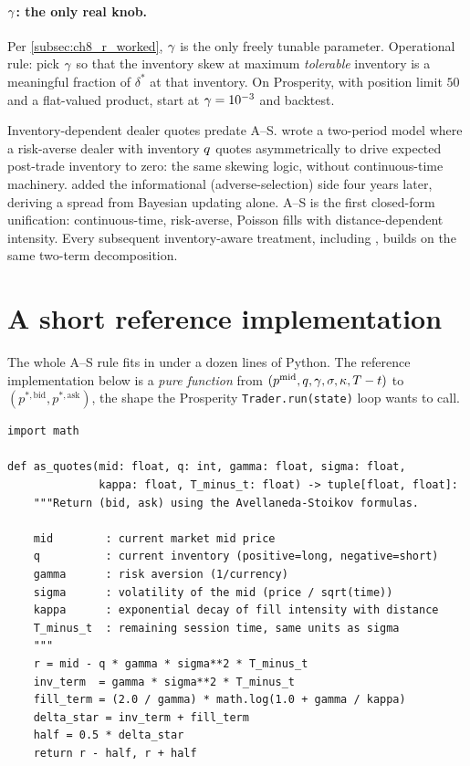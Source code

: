 \paragraph{$\gamma$: the only real knob.} Per
\cref{subsec:ch8_r_worked}, $\gamma$ is the only freely tunable
parameter. Operational rule: pick $\gamma$ so that the inventory
skew at maximum \emph{tolerable} inventory is a meaningful fraction
of $\delta^*$ at that inventory. On Prosperity, with position limit
$50$ and a flat-valued product, start at $\gamma = 10^{-3}$ and
backtest.

\begin{historybox}[title={Historical note: from Ho--Stoll to Avellaneda--Stoikov}]
Inventory-dependent dealer quotes predate A--S. \citet{hostoll1981}
wrote a two-period model where a risk-averse dealer with inventory
$q$ quotes asymmetrically to drive expected post-trade inventory
to zero: the same skewing logic, without continuous-time
machinery. \citeGM{} added the informational (adverse-selection)
side four years later, deriving a spread from Bayesian updating
alone. A--S \citeAS{} is the first closed-form unification:
continuous-time, risk-averse, Poisson fills with
distance-dependent intensity. Every subsequent inventory-aware
treatment, including \citet{cartea2015algorithmic}, builds
on the same two-term decomposition.
\end{historybox}

\section{A short reference implementation}
\label{sec:ch8_code}

The whole A--S rule fits in under a dozen lines of Python. The
reference implementation below is a \emph{pure function} from
$(p^{\mathrm{mid}}, q, \gamma, \sigma, \kappa, T - t)$ to
$(p^{*,\mathrm{bid}}, p^{*,\mathrm{ask}})$, the shape the
Prosperity \texttt{Trader.run(state)} loop wants to call.

\begin{lstlisting}[caption={Avellaneda--Stoikov quoting as a pure function.}]
import math

def as_quotes(mid: float, q: int, gamma: float, sigma: float,
              kappa: float, T_minus_t: float) -> tuple[float, float]:
    """Return (bid, ask) using the Avellaneda-Stoikov formulas.

    mid        : current market mid price
    q          : current inventory (positive=long, negative=short)
    gamma      : risk aversion (1/currency)
    sigma      : volatility of the mid (price / sqrt(time))
    kappa      : exponential decay of fill intensity with distance
    T_minus_t  : remaining session time, same units as sigma
    """
    r = mid - q * gamma * sigma**2 * T_minus_t
    inv_term  = gamma * sigma**2 * T_minus_t
    fill_term = (2.0 / gamma) * math.log(1.0 + gamma / kappa)
    delta_star = inv_term + fill_term
    half = 0.5 * delta_star
    return r - half, r + half
\end{lstlisting}

